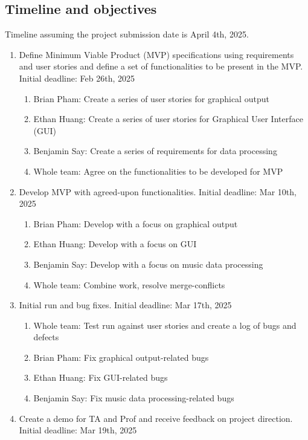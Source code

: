 \documentclass{article}
\begin{document}
\subsection{Timeline and objectives}
Timeline assuming the project submission date is April 4th, 2025.
\begin{enumerate}
    \item Define Minimum Viable Product (MVP) specifications using requirements and user stories and define a set of functionalities to be present in the MVP. Initial deadline: Feb 26th, 2025
    \begin{enumerate}
        \item Brian Pham: Create a series of user stories for graphical output
        \item Ethan Huang: Create a series of user stories for Graphical User Interface (GUI)
        \item Benjamin Say: Create a series of requirements for data processing
        \item Whole team: Agree on the functionalities to be developed for MVP\end{enumerate}
    \item Develop MVP with agreed-upon functionalities. Initial deadline: Mar 10th, 2025
    \begin{enumerate}
        \item Brian Pham: Develop with a focus on graphical output
        \item Ethan Huang: Develop with a focus on GUI
        \item Benjamin Say: Develop with a focus on music data processing
        \item Whole team: Combine work, resolve merge-conflicts\end{enumerate}
    \item Initial run and bug fixes. Initial deadline: Mar 17th, 2025
    \begin{enumerate}
        \item Whole team: Test run against user stories and create a log of bugs and defects
        \item Brian Pham: Fix graphical output-related bugs
        \item Ethan Huang: Fix GUI-related bugs
        \item Benjamin Say: Fix music data processing-related bugs \end{enumerate}
    \item Create a demo for TA and Prof and receive feedback on project direction. Initial deadline: Mar 19th, 2025

\end{enumerate}
\end{document}
